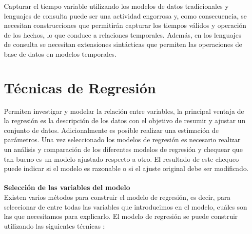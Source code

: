 Capturar el tiempo variable utilizando los modelos de datos tradicionales y lenguajes de consulta
puede ser una actividad engorrosa y, como consecuencia, se necesitan construcciones que permitirán
capturar los tiempos válidos y operación de los hechos, lo que conduce a relaciones temporales. Además,
en los lenguajes de consulta se necesitan  extensiones sintácticas que permiten las operaciones de base
de datos en modelos temporales.  \cite{yuzheng2011}

\section{Técnicas de Regresión}

Permiten investigar y modelar la relación entre variables, la principal ventaja de la regresión es la descripción de los datos con el 
objetivo de resumir y ajustar un conjunto de datos. Adicionalmente es posible realizar una estimación de parámetros. Una vez 
seleccionado los modelos de regresión es necesario realizar un análisis y comparación de los diferentes modelos de regresión y 
chequear que tan bueno es un modelo ajustado respecto a otro. El resultado de este chequeo puede indicar si el modelo es razonable 
o si el ajuste original debe ser modificado.\\
\textbf{\\Selección de las variables del modelo}\\
Existen varios métodos para construir el modelo de regresión, es decir, para seleccionar de entre todas las variables que introducimos 
en el modelo, cuáles son las que necesitamos para explicarlo. El modelo de regresión se puede construir utilizando las siguientes técnicas \cite{regresionmodel}: 
